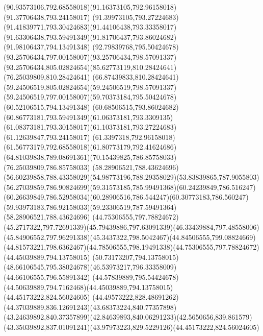 {{		\curveto(90.93573106,792.68558018)(91.16373105,792.96158018)(91.37706438,793.24158017)
		\curveto(91.39973105,793.27224683)(91.41839771,793.30424683)(91.44106438,793.33358017)
		\curveto(91.63306438,793.59491349)(91.81706437,793.86024682)(91.98106437,794.13491348)
		\curveto(92.79839768,795.50424678)(93.25706434,797.00158007)(93.25706434,798.57091337)
		\curveto(93.25706434,805.02824654)(85.62773119,810.28424641)(76.25039809,810.28424641)
		\curveto(66.87439833,810.28424641)(59.24506519,805.02824654)(59.24506519,798.57091337)
		\curveto(59.24506519,797.00158007)(59.70373184,795.50424678)(60.52106515,794.13491348)
		\curveto(60.68506515,793.86024682)(60.86773181,793.59491349)(61.06373181,793.3309135)
		\curveto(61.08373181,793.30158017)(61.10373181,793.27224683)(61.12639847,793.24158017)
		\curveto(61.3397318,792.96158018)(61.56773179,792.68558018)(61.80773179,792.41624686)
		\curveto(64.81039838,789.08691361)(70.15439825,786.85758033)(76.25039809,786.85758033)
		\moveto(58.28906521,788.43624696)
		\curveto(56.60239858,788.43358029)(54.98773196,788.29358029)(53.83839865,787.9055803)
		\curveto(56.27039859,786.90824699)(59.31573185,785.99491368)(60.24239849,786.516247)
		\curveto(60.26639849,786.52958034)(60.28906516,786.544247)(60.30773183,786.560247)
		\curveto(59.93973183,786.92158033)(59.23306519,787.59491364)(58.28906521,788.43624696)
		\moveto(44.75306555,797.78824672)
		\curveto(45.2717322,797.72691339)(45.79439886,797.63091339)(46.33439884,797.48558006)
		\curveto(45.84906552,797.96291338)(45.3437322,798.5042467)(44.84506555,799.08824669)
		\curveto(44.81573221,798.6362467)(44.78506555,798.19491338)(44.75306555,797.78824672)
		\moveto(44.45039889,794.13758015)
		\lineto(50.73173207,794.13758015)
		\curveto(48.66106545,795.38024678)(46.53973217,796.33358009)(44.66106555,796.55891342)
		\curveto(44.57839889,795.54424678)(44.50639889,794.7162468)(44.45039889,794.13758015)
		\moveto(44.45173222,824.56024605)
		\curveto(44.49573222,828.48691262)(44.37039889,836.12691243)(43.68373224,840.77357898)
		\curveto(43.24639892,840.37357899)(42.84639893,840.06291233)(42.5650656,839.861579)
		\curveto(43.35039892,837.01091241)(43.97973223,829.5229126)(44.45173222,824.56024605)
	}
}
